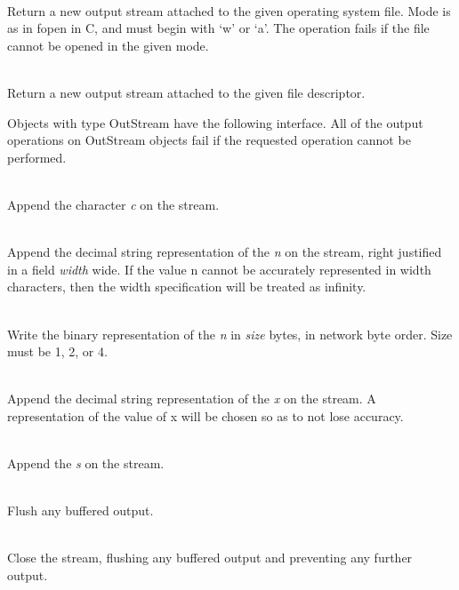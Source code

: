 \begin{desc}
  \item[\kw{operation} toUnix\/\LB{}fn \CO{} \tn{String}, mode \CO{} \tn{String}\/\RB{} \returns{} \/\LB{}OutStream\/\RB{}]~\\
    Return a new output stream attached to the given operating system file.
    Mode is as in fopen in C, and must begin with `w' or `a'.
    The operation fails if the file cannot be opened in the given mode.
  \item[\kw{operation} create\/\LB{}file \CO{} \tn{Integer}\/\RB{} \returns{} \/\LB{}OutStream\/\RB{}]~\\
    Return a new output stream attached to the given file descriptor. 
\end{desc}

\noindent Objects with type OutStream have the following interface.
All of the output operations on OutStream objects fail if the requested
operation cannot be performed.  

\begin{desc}
  \item[\kw{operation} putChar\/\LB{}c \CO{} \tn{Character}\/\RB{}]~\\
    Append the character {\it c} on the stream.
  \item[\kw{operation} putInt\/\LB{}n \CO{} \tn{Integer}, width \CO{} \tn{Integer}\/\RB{}]~\\
    Append the decimal string representation of the  {\it n} on the
    stream, right justified in a field {\it width} wide.  If the value n
    cannot be accurately represented in width characters, then the width
    specification will be treated as infinity.
  \item[\kw{operation} writeInt\/\LB{}n \CO{} \tn{Integer}, size \CO{} \tn{Integer}\/\RB{}]~\\
    Write the binary representation of the  {\it n} in {\it
    size} bytes, in network byte order.  Size must be 1, 2, or 4.
  \item[\kw{operation} putReal\/\LB{}x \CO{} \tn{Real}\/\RB{}]~\\
    Append the decimal string representation of the  {\it x} on the
    stream.  A representation of the value of x will be chosen so as to not
    lose accuracy.
  \item[\kw{operation} putString\/\LB{}s \CO{} \tn{String}\/\RB{}]~\\
    Append the  {\it s} on the stream.
  \item[\kw{operation} flush]~\\
    Flush any buffered output.
  \item[\kw{operation} close]~\\
    Close the stream, flushing any buffered output and preventing any
    further output.
\end{desc}

